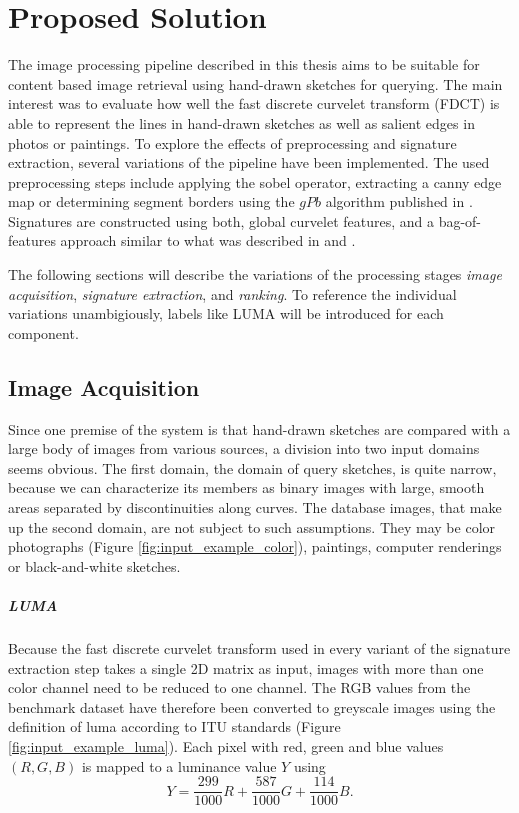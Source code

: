\chapter{Proposed Solution}\label{ch:solution}

The image processing pipeline described in this thesis aims to be suitable for
content based image retrieval using hand-drawn sketches for querying. The main
interest was to evaluate how well the fast discrete curvelet transform (FDCT)
\autocite{candes_fast_2006} is able to represent the lines in hand-drawn
sketches as well as salient edges in photos or paintings. To explore the
effects of preprocessing and signature extraction, several variations of the
pipeline have been implemented. The used preprocessing steps include applying
the sobel operator, extracting a canny edge map or determining segment borders
using the $gPb$ algorithm published in \autocite{arbelaez_contour_2011}.
Signatures are constructed using both, global curvelet features, and a
bag-of-features approach similar to what was described in
\autocite{sivic_video_2003} and \autocite{eitz_sketch-based_2010}.

The following sections will describe the variations of the processing stages
\emph{image acquisition}, \emph{signature extraction}, and \emph{ranking}. To
reference the individual variations unambigiously, labels like LUMA will
be introduced for each component.

\section{Image Acquisition}

Since one premise of the system is that hand-drawn sketches are compared with a
large body of images from various sources, a division into two input domains
seems obvious. The first domain, the domain of query sketches, is quite narrow,
because we can characterize its members as binary images with large, smooth
areas separated by discontinuities along curves. The database images, that make
up the second domain, are not subject to such assumptions. They may be color
photographs (Figure \ref{fig:input_example_color}), paintings, computer
renderings or black-and-white sketches.

\paragraph{LUMA}

Because the fast discrete curvelet transform used in every variant of the
signature extraction step takes a single 2D matrix as input, images with more
than one color channel need to be reduced to one channel. The RGB values from
the benchmark dataset have therefore been converted to greyscale images using
the definition of luma according to ITU standards \autocite{_parameter_2002}
(Figure \ref{fig:input_example_luma}).  Each pixel with red, green and blue
values $(R, G, B)$ is mapped to a luminance value $Y$ using
\begin{equation*}
    Y = \frac{299}{1000}R + \frac{587}{1000}G + \frac{114}{1000}B.
\end{equation*}

